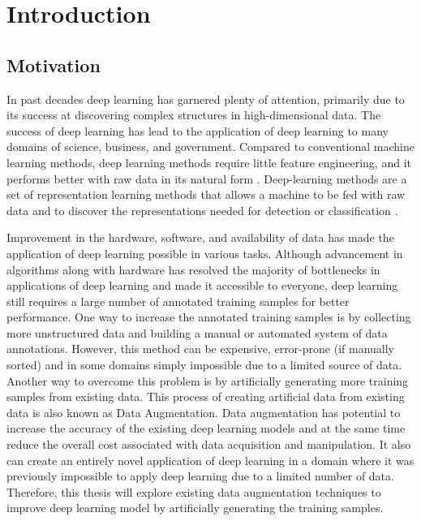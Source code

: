 
\chapter{Introduction}

\section{Motivation}

\label{chapter:intro}
In past decades deep learning has garnered plenty of attention, primarily due to its success at discovering complex structures in high-dimensional data. The success of deep learning has lead to the application of deep learning to many domains of science, business, and government. Compared to conventional machine learning methods, deep learning methods require little feature engineering, and it performs better with raw data in its natural form \citep{lecun2015deep}. Deep-learning methods are a set of representation learning methods that allows a machine to be fed with raw data and to discover the representations needed for detection or classification \citep{lecun2015deep}.

Improvement in the hardware, software, and availability of data has made the application of deep learning possible in various tasks. Although advancement in algorithms along with hardware has resolved the majority of bottlenecks in applications of deep learning and made it accessible to everyone, deep learning still requires a large number of annotated training samples for better performance. One way to increase the annotated training samples is by collecting more unstructured data and building a manual or automated system of data annotations. However, this method can be expensive, error-prone (if manually sorted) and in some domains simply impossible due to a limited source of data. Another way to overcome this problem is by artificially generating more training samples from existing data. This process of creating artificial data from existing data is also known as Data Augmentation. Data augmentation has potential to increase the accuracy of the existing deep learning models and at the same time reduce the overall cost associated with data acquisition and manipulation. It also can create an entirely novel application of deep learning in a domain where it was previously impossible to apply deep learning due to a limited number of data. Therefore, this thesis will explore existing data augmentation techniques to improve deep learning model by artificially generating the training samples.


